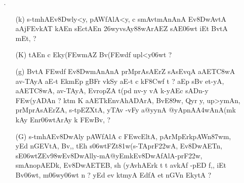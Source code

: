 \def\DevnagVersion{2.15}\documentclass{article}
\begin{document}
\begin{itemize}
\begin{itemize}
 \item[({\dn K})] {\dn fA{\rs ???\re}ZA a@yApn-y{\rs ,\re} t\? c -vt\306w/tnJ\306wT\3FEwZyn-y{\rs ,\re} Zv\306wtAyA\2 pErmAZ\? vA yA kAEc avnEt, -yA sA Ek\2lA iEt m\306wy\381w\? Bv\306wt, {\rs ?\re} }
 
 \item[({\dn g})] {\dn fAZA a@yynA@yApnyo, yA prMprAgtA\2 sArAEZ,{\rs ,\re} sA k\?nEc \3FEwkAr\?Z up-tA stF yo\35FwEp t uGog\2 \3FEwZv\306wtr\2 vFy\0v\381wr\2 c kEr\309wyAEt{\rs ---\re}aEp aE-t et BvtA mt {\rs ?\re}} 
 
 \item[({\dn G})] {\dn s\2-tmhAEv\38DwAly\? pAWfAlA c vt\0mAnA s\2-tA@yApn{\rs -\re}p\392wEt s\2-tpAWn\387wm\? c bhv\306wmt\?n k\? ZA, doqA, vA {\rs ?\re} t`dtAnA\2 ZAnA aproD\?n doqAZA\2 Enbh\0ZAy kA upAyA Bv\306wt, cy\?, {\rs ?\re} }
 
 \end{itemize}
 
 \item[{\dn \dnnum \rn{17}} .]\begin{itemize}
               
               \item[({\dn k})] {\dn s\2-tmhAEv\38Dwly\?<y, pAWfAlA<y, c smAvt\0mAnAnA\2 Ev\38DwAvtA aAjFEvkAT\0 kAEn sEctAEn \326wyvsAy\388wArAEZ sAE\306wt iEt BvtA\2 mEt, {\rs ?\re}}
               
               \item[({\dn K})] {\dn tAEn c Eky(\3FEwmAZ\2 Bv(\3FEwd\?f\? upl<y\306wt\? {\rs ?\re}}
 
               \item[({\dn g})] {\dn BvtA\2 \3FEwd\?f\? Ev\38DwmAnAnA\2 prMprAsAErZ\2 sA\2sEvqA aAET\3C8wA av-TAyA aE-t EkmEp gBFr\2 v\4kSy aE-t c\? kF\38Cwf\2 t {\rs ?\re} aEp s\2Bv\? et-yA, aAET\0\3C8wA, av-TAyA, EvropZA t(pd\? nv-y vA k-yAEc sADn-y \3FEw(yADAn {\rs ?\re} ktm\? K aAET\2kEnvA\0hADArA, BvE\389w, Qy\?r y\4, up>ymAn\4, prMprAsAErZA, s\2-tpEZXtA, yTAv{\rdt} -vFy a@yynA @yApnA\3A4wAnA(mk\2 kAy{\rdt} Enr\306wtArAy\2 k\0 \3FEwBv\?, {\rs ?\re}} 
               
               \item[({\dn G})] {\dn s\2-tmhAEv\38DwAly\? pAWfAlA c \3FEwcEltA, pArMpErkpAWn\387wm, yEd nG\0EVtA, Bv\?,{\rs ,\re} tEh\2 s\306wtFZ\0t\381w(s\2-TAprF\322wA, Ev\38DwAET\2n, sE\306wtZ\0{\rs -\re}Ev\398wEv\38DwAlly{\rs -\re}mA@yEmkEv\38DwAfAlA{\rs -\re}prF\322w\4, smAnopAEDk\4, Ev\38DwAET\2EB, sh (yAvhAErk\? t\? t\? avkAf\? -pED\2\2 f,{\rs ,\re} iEt Bv\306wt, m\306wy\306wt\? n {\rs ?\re} yEd ev ktmyA EdfA et nG\0V\0n\2 EkytA {\rs ?\re}}
               

\end{itemize}
\end{itemize}
\end{document}
